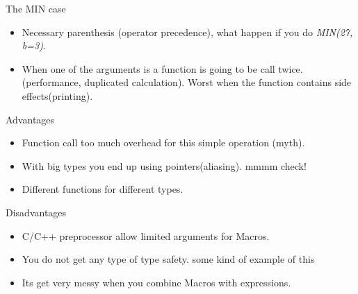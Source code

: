 
\begin{frame}{The MIN case}
    \begin{itemize}\addtolength{\itemsep}{2\baselineskip}
        \item Necessary parenthesis (operator precedence), what happen if you 
            do \emph{MIN(27, b=3)}.

        \item When one of the arguments is a function is going to be call twice. 
            (performance, duplicated calculation). Worst when the function
            contains side effects(printing).
    \end{itemize}
\end{frame}

\begin{frame}{Advantages}
    \begin{itemize}\addtolength{\itemsep}{1\baselineskip}
        \item Function call too much overhead for this simple operation (myth).

        \item With big types you end up using pointers(aliasing).
            {\color{red}mmmm check!}

        \item Different functions for different types.
    \end{itemize}
\end{frame}

\begin{frame}{Disadvantages}
    \begin{itemize}\addtolength{\itemsep}{1\baselineskip}
        \item C/C++ preprocessor allow limited arguments for Macros.

        \item You do not get any type of type safety.
            {\color{red} some kind of example of this}

        \item Its get very messy when you combine Macros with expressions.
    \end{itemize}
\end{frame}

